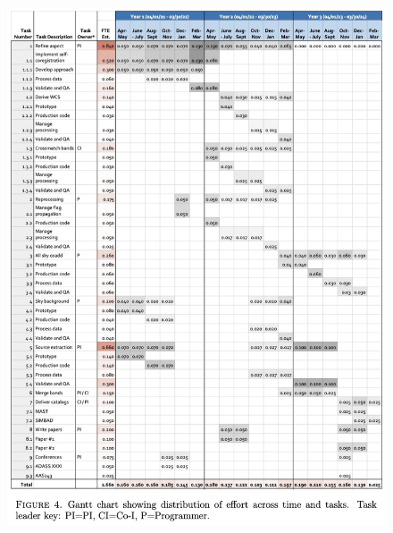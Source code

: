 \documentclass[12pt,oneside]{book}
\begin{document}
\begin{figure}[h]
\centering
\includegraphics[width=\textwidth]{Gantt_01.png}
\centering
\end{figure}
\end{document}
